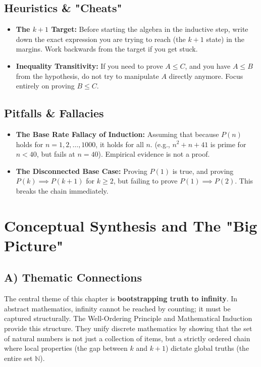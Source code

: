 \documentclass[11pt, a4paper]{article}
\theoremstyle{definition}
\theoremstyle{remark}
\newcommand{\N}{\mathbb{N}}
\begin{document}
\subsection{Heuristics \& "Cheats"}
\begin{itemize}
    \item \textbf{The $k+1$ Target:} Before starting the algebra in the inductive step, write down the exact expression you are trying to reach (the $k+1$ state) in the margins. Work backwards from the target if you get stuck.
    \item \textbf{Inequality Transitivity:} If you need to prove $A \le C$, and you have $A \le B$ from the hypothesis, do not try to manipulate $A$ directly anymore. Focus entirely on proving $B \le C$.
\end{itemize}

\subsection{Pitfalls \& Fallacies}
\begin{itemize}
    \item \textbf{The Base Rate Fallacy of Induction:} Assuming that because $P(n)$ holds for $n=1, 2, \dots, 1000$, it holds for all $n$. (e.g., $n^2 + n + 41$ is prime for $n < 40$, but fails at $n=40$). Empirical evidence is not a proof.
    \item \textbf{The Disconnected Base Case:} Proving $P(1)$ is true, and proving $P(k) \implies P(k+1)$ for $k \ge 2$, but failing to prove $P(1) \implies P(2)$. This breaks the chain immediately.
\end{itemize}

\newpage
\section{Conceptual Synthesis and The "Big Picture"}

\subsection{A) Thematic Connections}
The central theme of this chapter is \textbf{bootstrapping truth to infinity}. In abstract mathematics, infinity cannot be reached by counting; it must be captured structurally. The Well-Ordering Principle and Mathematical Induction provide this structure. They unify discrete mathematics by showing that the set of natural numbers is not just a collection of items, but a strictly ordered chain where local properties (the gap between $k$ and $k+1$) dictate global truths (the entire set $\N$).
\end{document}
